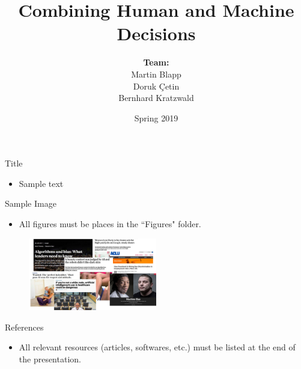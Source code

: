 \documentclass[11pt]{beamer}
\begin{document}
\author[]{\begin{tabular}{c} 
\\ \textbf{Team:} \\
{\small Martin Blapp}\\
{\small Doruk Çetin}\\
{\small Bernhard Kratzwald}\\
\end{tabular}}

\date{Spring 2019}

\title{Combining Human and Machine Decisions}



\begin{frame}{Title}
\begin{itemize}
\item Sample text
\end{itemize}
\end{frame}

\begin{frame}{Sample Image}
\begin{itemize}
\item All figures must be places in the ``Figures" folder.
\end{itemize}
\begin{figure}[t!]
    \centering
        \includegraphics[width=0.5\textwidth]{Figures/media_negative.pdf}
\end{figure}
\end{frame}


\begin{frame}{References}
\begin{itemize}
\item All relevant resources (articles, softwares, etc.) must be listed at the end of the presentation.
\end{itemize}
\end{frame}
\end{document}
